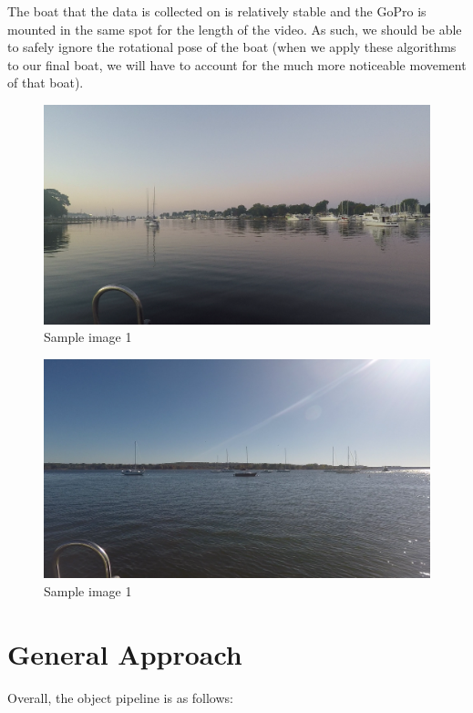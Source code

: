 \documentclass{article}
\begin{document}
The boat that the data is collected on is relatively stable
and the GoPro is mounted in the same spot for the length
of the video. As such, we should be able to safely ignore
the rotational pose of the boat (when we apply these
algorithms to our final boat, we will have to account for
the much more noticeable movement of that boat).

\begin{figure}[H]
\includegraphics[width=12cm]{sample1}
\centering
\caption{Sample image 1}
\end{figure}
\begin{figure}[H]
\includegraphics[width=12cm]{sample2}
\centering
\caption{Sample image 1}
\end{figure}


\section{General Approach}

Overall, the object pipeline is as follows:
\end{document}
